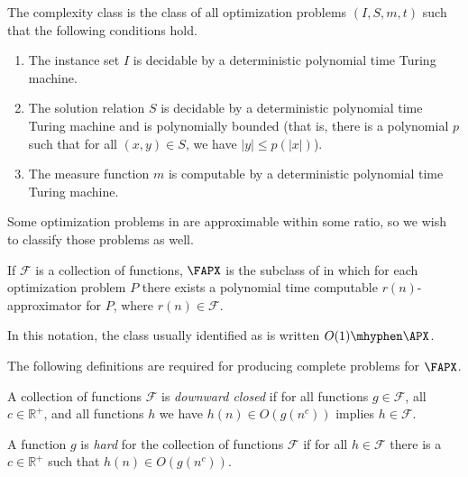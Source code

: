\documentclass{article}
\begin{document}
\begin{definition}
  The complexity class \NPO{} is the class of all optimization problems $(I, S, m, t)$ such that the following conditions hold.
  \begin{enumerate}
  \item The instance set $I$ is decidable by a deterministic polynomial time Turing machine.
  \item The solution relation $S$ is decidable by a deterministic polynomial time Turing machine and is polynomially bounded (that is, there is a polynomial $p$ such that for all $(x, y) \in S$, we have $|y| \leq p(|x|)$).
  \item The measure function $m$ is computable by a deterministic polynomial time Turing machine.
  \end{enumerate}
\end{definition}

Some optimization problems in \NPO{} are approximable within some ratio, so we wish to classify those problems as well.

\begin{definition}
  If $\mathcal{F}$ is a collection of functions, $\FAPX$ is the subclass of \NPO{} in which for each optimization problem $P$ there exists a polynomial time computable $r(n)$-approximator for $P$, where $r(n) \in \mathcal{F}$.
\end{definition}

In this notation, the class usually identified as \APX{} is written $O(1)\mhyphen\APX$.

The following definitions are required for producing complete problems for $\FAPX$.

\begin{definition}\label{def:downwardclosed}
  A collection of functions $\mathcal{F}$ is \emph{downward closed} if for all functions $g \in \mathcal{F}$, all $c \in \mathbb{R}^+$, and all functions $h$ we have $h(n) \in O(g(n^c))$ implies $h \in \mathcal{F}$.
\end{definition}

\begin{definition}\label{def:hardfunction}
  A function $g$ is \emph{hard} for the collection of functions $\mathcal{F}$ if for all $h \in \mathcal{F}$ there is a $c \in \mathbb{R}^+$ such that $h(n) \in O(g(n^c))$.
\end{definition}
\end{document}
